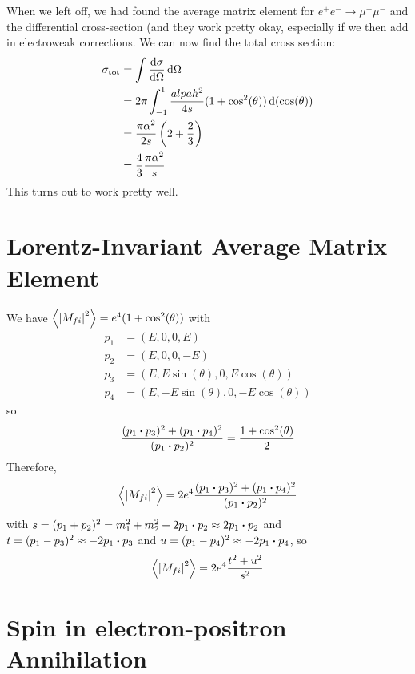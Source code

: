\documentclass[a4paper,twoside,master.tex]{subfiles}
\begin{document}

When we left off, we had found the average matrix element for $ e^+ e^- \to \mu^+ \mu^- $ and the differential cross-section (and they work pretty okay, especially if we then add in electroweak corrections. We can now find the total cross section:
\begin{align}
    \sigma_{\text{tot}} &= \int \dv{\sigma}{\Omega} \dd{\Omega} \\
                        &= 2 \pi \int_{-1}^{1} \frac{alpah^2}{4 s} (1 + \cos[2](\theta)) \dd{(\cos(\theta))} \\
                        &= \frac{\pi \alpha^2}{2 s} \left( 2 + \frac{2}{3} \right) \\
                        &= \frac{4}{3} \frac{\pi \alpha^2}{s}
\end{align}
This turns out to work pretty well.

\section{Lorentz-Invariant Average Matrix Element}\label{sec:lorentz-invariant_average_matrix_element}

We have $ \ev{\abs{M_{fi}}^2} = e^4 (1 + \cos[2](\theta)) $ with
\begin{align}
    p_1 &= (E, 0, 0, E) \\
    p_2 &= (E, 0, 0, -E) \\
    p_3 &= (E, E \sin(\theta), 0, E \cos(\theta)) \\
    p_4 &= (E, - E \sin(\theta), 0, - E \cos(\theta))
\end{align}
so
\begin{equation}
    \frac{(p_1 \vdot p_3)^2 + (p_1 \vdot p_4)^2}{(p_1 \vdot p_2)^2} = \frac{1 + \cos[2](\theta)}{2}
\end{equation}
Therefore,
\begin{equation}
    \ev{\abs{M_{fi}}^2} = 2 e^4 \frac{(p_1 \vdot p_3)^2 + (p_1 \vdot p_4)^2}{(p_1 \vdot p_2)^2}
\end{equation}
with $ s = (p_1 + p_2)^2 = m_1^2 + m_2^2 + 2 p_1 \vdot p_2 \approx 2 p_1 \vdot p_2 $ and $ t = (p_1 - p_3)^2 \approx - 2 p_1 \vdot p_3 $ and $ u = (p_1 - p_4)^2 \approx - 2 p_1 \vdot p_4 $, so
\begin{equation}
    \ev{\abs{M_{fi}}^2} = 2 e^4 \frac{t^2 + u^2}{s^2}
\end{equation}

\section{Spin in electron-positron Annihilation}\label{sec:spin_in_electron-positron_annihilation}
\end{document}
